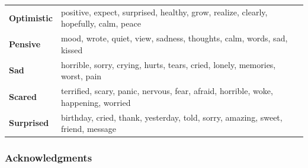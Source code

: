 \documentclass{article} %
\begin{document}
\begin{table}[H]
\begin{center}
\begin{tabular}{ l | l}
    \textbf{Optimistic} & positive, expect, surprised, healthy, grow, realize, clearly, hopefully, calm, peace\\
    \textbf{Pensive} & mood, wrote, quiet, view, sadness, thoughts, calm, words, sad, kissed\\
    \textbf{Sad} & horrible, sorry, crying, hurts, tears, cried, lonely, memories, worst, pain\\
    \textbf{Scared} & terrified, scary, panic, nervous, fear, afraid, horrible, woke, happening, worried\\
    \textbf{Surprised} & birthday, cried, thank, yesterday, told, sorry, amazing, sweet, friend,  message\\
    \end{tabular}
\end{center} 
\label{top-words}
\end{table}


\subsubsection*{Acknowledgments}



\end{document}

